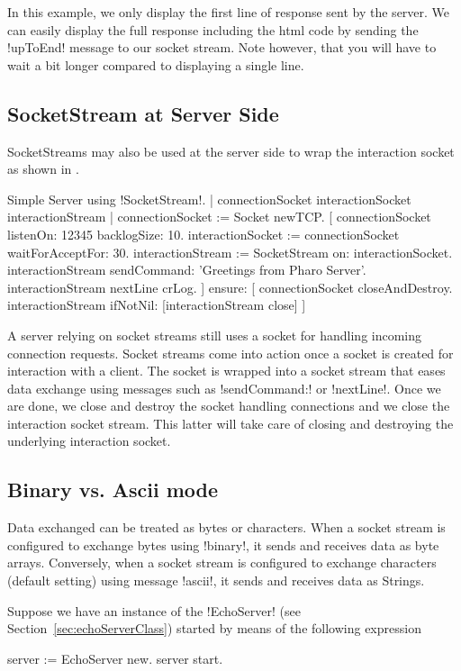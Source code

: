 \documentclass[a4paper,10pt,twoside]{book}
\begin{document}
In this example, we only display the first line of response sent by the server.
We can easily display the full response including the html code by sending the \ct!upToEnd! message to our socket stream.
Note however, that you will have to wait a bit longer compared to displaying a single line.

\subsection{SocketStream at Server Side}
SocketStreams may also be used at the server side to wrap the interaction socket as shown in .

\begin{script}{Simple Server using \ct!SocketStream!.}
| connectionSocket interactionSocket interactionStream |
connectionSocket := Socket newTCP. 
[
	connectionSocket listenOn: 12345 backlogSize: 10. 
	interactionSocket := connectionSocket waitForAcceptFor: 30. 
	interactionStream := SocketStream on: interactionSocket.
	interactionStream sendCommand: 'Greetings from Pharo Server'.
	interactionStream nextLine crLog.
] ensure: [
	connectionSocket closeAndDestroy.
	interactionStream ifNotNil: [interactionStream close]
]
\end{script}

A server relying on socket streams still uses a socket for handling incoming connection requests.
Socket streams come into action once a socket is created for interaction with a client.
The socket is wrapped into a socket stream that eases data exchange using messages such as \ct!sendCommand:! or \ct!nextLine!.
Once we are done, we close and destroy the socket handling connections and we close the interaction socket stream.
This latter will take care of closing and destroying the underlying interaction socket.

\subsection{Binary vs. Ascii mode}
Data exchanged can be treated as bytes or characters. When a socket stream is configured to exchange bytes using \ct!binary!, it sends and receives data as byte arrays.
Conversely, when a socket stream is configured to exchange characters (default setting) using message \ct!ascii!, it sends and receives data as Strings.

Suppose we have an instance of the \ct!EchoServer! (see Section~\ref{sec:echoServerClass}) started by means of the following expression
\begin{code}{}
server := EchoServer new.
server start.
\end{code}
\end{document}
